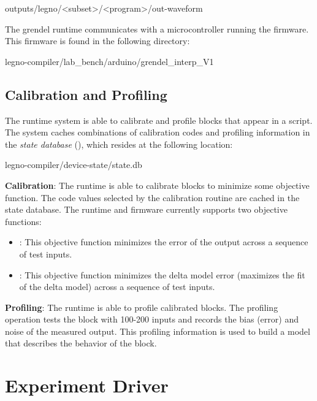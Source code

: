 \begin{snippet}
  outputs/legno/<subset>/<program>/out-waveform
\end{snippet}

The grendel runtime communicates with a microcontroller running the \grendel
firmware. This firmware is found in the following directory:

\begin{snippet}
  legno-compiler/lab_bench/arduino/grendel_interp_V1
\end{snippet}

\subsection{Calibration and Profiling}

The \grendel runtime system is able to calibrate and profile blocks that appear
in a \grendel script. The system caches combinations of calibration codes and
profiling information in the \textit{state database} (), which
resides at the following location:

\begin{snippet}
  legno-compiler/device-state/state.db
\end{snippet}


\noindent\textbf{Calibration}: The \grendel runtime is able to calibrate blocks to
minimize some objective function. The code values selected by the calibration
routine are cached in the state database. The runtime and firmware currently supports
two objective functions:

\begin{itemize}
\item{}: This objective function minimizes the error of the output across a
  sequence of test inputs.
\item{}: This objective function minimizes the delta model error
  (maximizes the fit of the delta model) across a sequence of test inputs. 
\end{itemize}

\noindent\textbf{Profiling}: The \grendel runtime is able to profile calibrated blocks.
The profiling operation tests the block with 100-200 inputs and records the
bias (error) and noise of the measured output. This profiling information is
used to build a model that describes the behavior of the block.

\section{Experiment Driver}

